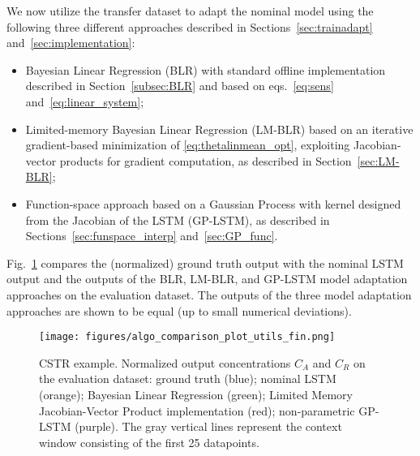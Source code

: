 \documentclass{article}
\begin{document}
We now utilize the transfer dataset to adapt the nominal model using the following three different approaches described in Sections~\ref{sec:trainadapt}  and~\ref{sec:implementation}: 
\begin{itemize}
    \item Bayesian Linear Regression (BLR) with standard offline implementation described in Section~\ref{subsec:BLR} 
    and based on  eqs.~\eqref{eq:sens} and~\eqref{eq:linear_system};
    \item Limited-memory Bayesian Linear Regression (LM-BLR) based on an iterative gradient-based minimization of \eqref{eq:thetalinmean_opt}, exploiting Jacobian-vector products for gradient computation, as described in Section~\ref{sec:LM-BLR};
    \item Function-space approach based on a Gaussian Process with  kernel designed from the Jacobian of the LSTM (GP-LSTM), as described in Sections~\ref{sec:funspace_interp} and~\ref{sec:GP_func}. 
\end{itemize}


 Fig.~\ref{LSTM-compare1} compares the (normalized) ground truth output with the nominal LSTM output and 
 the outputs of the BLR, LM-BLR, and GP-LSTM model adaptation approaches on the evaluation dataset. The 
 outputs of the three model adaptation approaches are shown to be equal (up to small numerical deviations). 

 \begin{figure}%
    \centering
    \texttt{[image: figures/algo\_comparison\_plot\_utils\_fin.png]}
    \caption{ CSTR example. Normalized output concentrations $C_A$ and $C_R$ on the evaluation dataset: ground truth (blue); nominal LSTM (orange);   Bayesian Linear Regression (green); Limited Memory Jacobian-Vector Product implementation (red); non-parametric GP-LSTM (purple). The gray vertical lines represent the context window consisting of the first 25 datapoints.} 
    \label{LSTM-compare1}
\end{figure}
\end{document}
